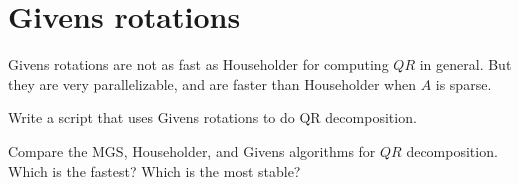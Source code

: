 \section*{Givens rotations}

Givens rotations are not as fast as Householder for computing $QR$ in general. But they are very parallelizable, and are faster than Householder when $A$ is sparse.

\begin{problem}
Write a script that uses Givens rotations to do QR decomposition.
\end{problem}

\begin{problem} 
Compare the MGS, Householder, and Givens algorithms for $QR$ decomposition. Which is the fastest? Which is the most stable?
\end{problem}


